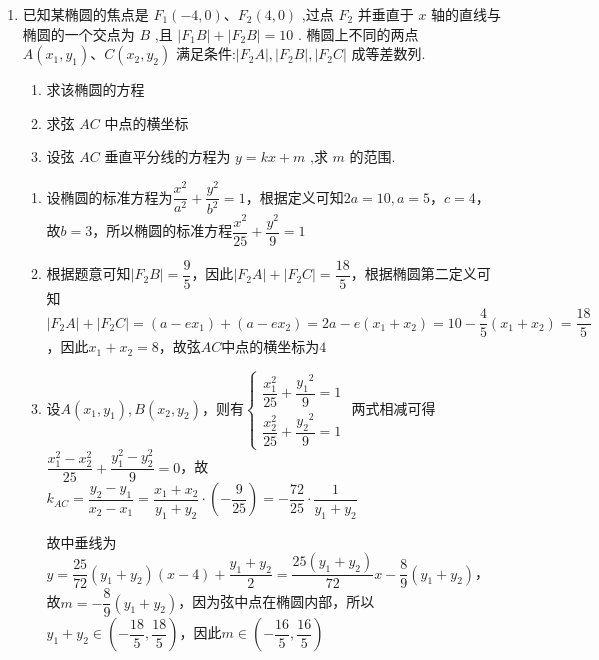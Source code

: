 \begin{enumerate}
    \item 已知某椭圆的焦点是 ${F}_{1}\left( {-4,0}\right) \text{、}{F}_{2}\left( {4,0}\right)$ ,过点 ${F}_{2}$ 并垂直于 $x$ 轴的直线与椭圆的一个交点为 $B$ ,且 $\left| {{F}_{1}B}\right|  + \left| {{F}_{2}B}\right|  = {10}$ . 椭圆上不同的两点 $A\left( {{x}_{1},{y}_{1}}\right) \text{、}C\left( {{x}_{2},{y}_{2}}\right)$ 满足条件:$\left| {{F}_{2}A}\right| ,\left| {{F}_{2}B}\right| ,\left| {{F}_{2}C}\right|$ 成等差数列.
    \begin{enumerate}
        \item 求该椭圆的方程
        \item 求弦 ${AC}$ 中点的横坐标
        \item 设弦 ${AC}$ 垂直平分线的方程为 $y = {kx} + m$ ,求 $m$ 的范围.
    \end{enumerate}
    \begin{jieda}
        \begin{enumerate}
            \item 设椭圆的标准方程为$\dfrac{x^2}{a^2}+\dfrac{y^2}{b^2} = 1$，根据定义可知$2a = 10, a= 5$，$c = 4$，故$b = 3$，所以椭圆的标准方程$\dfrac{x^2}{25}+\dfrac{y^2}{9} = 1$
            \item 根据题意可知$|F_2B| = \dfrac{9}{5}$，因此$|F_2A| + |F_2C| = \dfrac{18}{5}$，根据椭圆第二定义可知$|F_2A| + |F_2C| = (a-ex_1)+(a-ex_2) = 2a-e(x_1+x_2) = 10 - \dfrac{4}{5}(x_1+x_2) = \dfrac{18}{5}$，因此$x_1+x_2 = 8$，故弦$AC$中点的横坐标为$4$
            \item 设$A(x_1, y_1), B(x_2, y_2)$，则有$\left\{\begin{array}{l}
             \dfrac{x_1^2}{25} + \dfrac{{y_1}^{2}}{9} = 1  \\
             \dfrac{x_2^2}{25} + \dfrac{{y_2}^{2}}{9} = 1 
            \end{array}\right.$
            两式相减可得$\dfrac{x_1^2-x_2^2}{25} + \dfrac{y_1^2-y_2^2}{9} = 0$，故$k_{AC} = \dfrac{y_2-y_1}{x_2-x_1} = \dfrac{x_1+x_2}{y_1+y_2} \cdot \left(-\dfrac{9}{25}\right) = -\dfrac{72}{25} \cdot \dfrac{1}{y_1+y_2}$

            故中垂线为$y= \dfrac{25}{72}(y_1+y_2)\left(x - 4\right) + \dfrac{y_1+y_2}{2} = \dfrac{25(y_1+y_2)}{72}x-\dfrac{8}{9}(y_1+y_2)$，故$m = -\dfrac{8}{9}(y_1+y_2)$，因为弦中点在椭圆内部，所以$y_1+y_2 \in \left(-\dfrac{18}{5}, \dfrac{18}{5}\right)$，因此$m \in \left(-\dfrac{16}{5}, \dfrac{16}{5}\right)$
        \end{enumerate}
    \end{jieda}
\end{enumerate}
